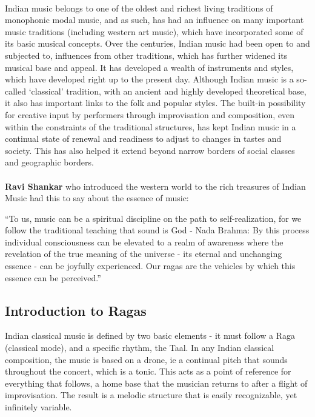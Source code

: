 \documentclass[12pt,a4paper]{article}
\begin{document}
\paragraph{}
Indian music belongs to one of the oldest and richest living traditions of monophonic modal music, and as such, has had an influence on many important music traditions (including western art music), which have incorporated some of its basic musical concepts. Over the centuries, Indian music had been open to and subjected to, influences from other traditions, which has further widened its musical base and appeal. It has developed a wealth of instruments and styles, which have developed right up to the present day. Although Indian music is a so-called ‘classical’ tradition, with an ancient and highly developed theoretical base, it also has important links to the folk and popular styles. The built-in possibility for creative input by performers through improvisation and composition, even within the constraints of the traditional structures, has kept Indian music in a continual state of renewal and readiness to adjust to changes in tastes and society. This has also helped it extend beyond narrow borders of social classes and geographic borders.
\paragraph{	}
{\textbf{Ravi Shankar}} who introduced the western world to the rich treasures of Indian Music had this to say about the essence of music:

“To us, music can be a spiritual discipline on the path to self-realization, for we follow the traditional teaching that sound is God - Nada Brahma: By this process individual consciousness can be elevated to a realm of awareness where the revelation of the true meaning of the universe - its eternal and unchanging essence - can be joyfully experienced. Our ragas are the vehicles by which this essence can be perceived.” 

\subsection{Introduction to Ragas}
Indian classical music is defined by two basic elements - it must follow a Raga (classical mode), and a specific rhythm, the Taal. In any Indian classical composition, the music is based on a drone, ie a continual pitch that sounds throughout the concert, which is a tonic. This acts as a point of reference for everything that follows, a home base that the musician returns to after a flight of improvisation. The result is a melodic structure that is easily recognizable, yet infinitely variable.
\end{document}
